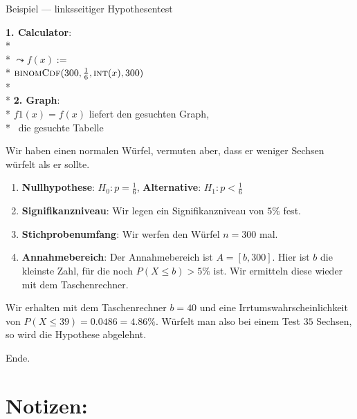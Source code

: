\begin{bla}{Beispiel --- linksseitiger Hypothesentest}
  \begin{marginfigure}
    \begin{tcolorbox}[colback=white!95!black,colframe=white!75!black,title=CAS:,arc=0mm]
      \begin{scriptsize}
        \textbf{1. Calculator}: \\*
         \\*
        \( \leadsto f(x) := \) \\* \hfill \( \text{\textsc{binomCdf}}(300, \tfrac{1}{6}, \text{\textsc{int}}(x), 300) \) \\*
        \ \\*
        \textbf{2. Graph}: \\*
        \( f1(x) = f(x) \) liefert den gesuchten Graph, \\*
         \ die gesuchte Tabelle
      \end{scriptsize}
    \end{tcolorbox}
  \end{marginfigure}
  Wir haben einen normalen Würfel, vermuten aber, dass er weniger Sechsen würfelt als er sollte.
  \begin{enumerate}
    \item \textbf{Nullhypothese}: $H_0: p=\tfrac{1}{6}$, \textbf{Alternative}: $H_1: p<\tfrac{1}{6}$
    \item \textbf{Signifikanzniveau}: Wir legen ein Signifikanzniveau von $5\%$ fest.
    \item \textbf{Stichprobenumfang}: Wir werfen den Würfel $n=300$ mal.
    \item \textbf{Annahmebereich}: Der Annahmebereich ist $A=[b,300]$. Hier ist $b$ die kleinste Zahl, für die noch $P(X \leq b) > 5\%$ ist. Wir ermitteln diese wieder mit dem Taschenrechner.
  \end{enumerate}
  Wir erhalten mit dem Taschenrechner $b=40$ und eine Irrtumswahrscheinlichkeit von $P(X \leq 39)=0.0486=4.86\%$. Würfelt man also bei einem Test $35$ Sechsen, so wird die Hypothese abgelehnt.
\end{bla}

Ende.

\clearpage
\thispagestyle{empty}
\section*{Notizen:}
\hfill
\clearpage
\thispagestyle{empty}
